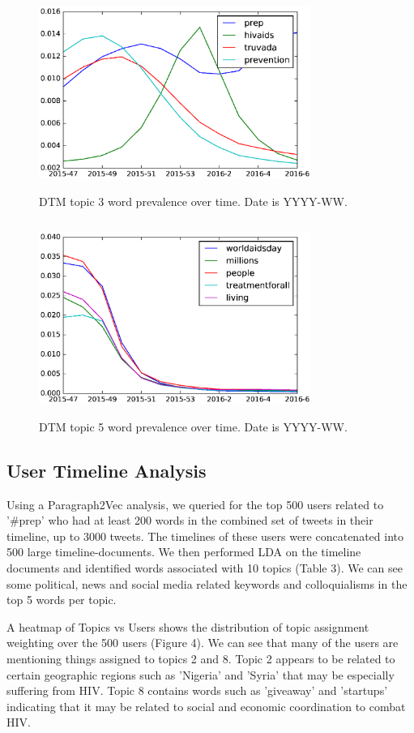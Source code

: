 \documentclass{sig-alternate-05-2015}
\begin{document}
\begin{figure}
\centering
\includegraphics[height=2.5in, width=3.5in]{fig1}
\caption{DTM topic 3 word prevalence over time. Date is YYYY-WW.}
\end{figure}

\begin{figure}
\centering
\includegraphics[height=2.5in, width=3.5in]{fig2}
\caption{DTM topic 5 word prevalence over time. Date is YYYY-WW.}
\end{figure}

\subsection{User Timeline Analysis}

Using a Paragraph2Vec analysis, we queried for the top 500 users related to '\#prep' who had at least 200 words in the combined set of tweets in their timeline, up to 3000 tweets. The timelines of these users were concatenated into 500 large timeline-documents. We then performed LDA on the timeline documents and identified words associated with 10 topics (Table 3). We can see some political, news and social media related keywords and colloquialisms in the top 5 words per topic.

A heatmap of Topics vs Users shows the distribution of topic assignment weighting over the 500 users (Figure 4). We can see that many of the users are mentioning things assigned to topics 2 and 8. Topic 2 appears to be related to certain geographic regions such as 'Nigeria' and 'Syria' that may be especially suffering from HIV. Topic 8 contains words such as 'giveaway' and 'startups' indicating that it may be related to social and economic coordination to combat HIV.
\end{document}
